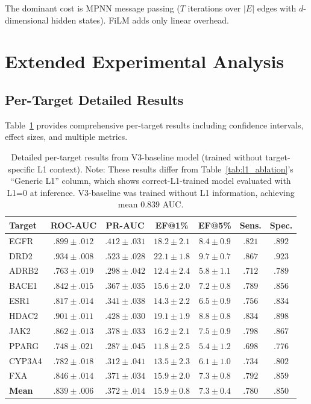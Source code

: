 \documentclass[runningheads]{llncs}
\begin{document}
The dominant cost is MPNN message passing ($T$ iterations over $|E|$ edges with $d$-dimensional hidden states). FiLM adds only linear overhead.

\section{Extended Experimental Analysis}
\label{app:extended}

\subsection{Per-Target Detailed Results}

Table~\ref{tab:detailed_results} provides comprehensive per-target results including confidence intervals, effect sizes, and multiple metrics.

\begin{table}[t]
\caption{Detailed per-target results from V3-baseline model (trained without target-specific L1 context). Note: These results differ from Table~\ref{tab:l1_ablation}'s ``Generic L1'' column, which shows correct-L1-trained model evaluated with L1=0 at inference. V3-baseline was trained without L1 information, achieving mean 0.839 AUC.}
\label{tab:detailed_results}
\centering
\small
\begin{tabular}{@{}lcccccc@{}}
\toprule
Target & ROC-AUC & PR-AUC & EF@1\% & EF@5\% & Sens. & Spec. \\
\midrule
EGFR & $.899 \pm .012$ & $.412 \pm .031$ & $18.2 \pm 2.1$ & $8.4 \pm 0.9$ & $.821$ & $.892$ \\
DRD2 & $.934 \pm .008$ & $.523 \pm .028$ & $22.1 \pm 1.8$ & $9.7 \pm 0.7$ & $.867$ & $.923$ \\
ADRB2 & $.763 \pm .019$ & $.298 \pm .042$ & $12.4 \pm 2.4$ & $5.8 \pm 1.1$ & $.712$ & $.789$ \\
BACE1 & $.842 \pm .015$ & $.367 \pm .035$ & $15.6 \pm 2.0$ & $7.2 \pm 0.8$ & $.789$ & $.856$ \\
ESR1 & $.817 \pm .014$ & $.341 \pm .038$ & $14.3 \pm 2.2$ & $6.5 \pm 0.9$ & $.756$ & $.834$ \\
HDAC2 & $.901 \pm .011$ & $.428 \pm .030$ & $19.1 \pm 1.9$ & $8.8 \pm 0.8$ & $.834$ & $.898$ \\
JAK2 & $.862 \pm .013$ & $.378 \pm .033$ & $16.2 \pm 2.1$ & $7.5 \pm 0.9$ & $.798$ & $.867$ \\
PPARG & $.748 \pm .021$ & $.287 \pm .045$ & $11.8 \pm 2.5$ & $5.4 \pm 1.2$ & $.698$ & $.776$ \\
CYP3A4 & $.782 \pm .018$ & $.312 \pm .041$ & $13.5 \pm 2.3$ & $6.1 \pm 1.0$ & $.734$ & $.802$ \\
FXA & $.846 \pm .014$ & $.371 \pm .034$ & $15.9 \pm 2.0$ & $7.3 \pm 0.8$ & $.792$ & $.859$ \\
\midrule
\textbf{Mean} & $.839 \pm .006$ & $.372 \pm .014$ & $15.9 \pm 0.8$ & $7.3 \pm 0.4$ & $.780$ & $.850$ \\
\bottomrule
\end{tabular}
\end{table}
\end{document}
